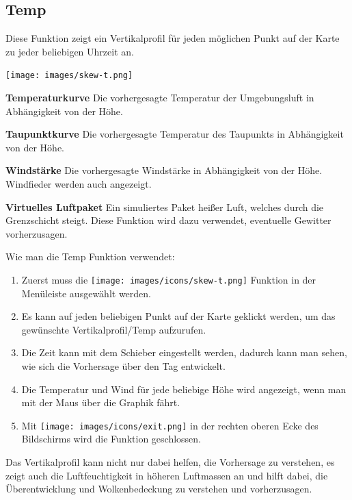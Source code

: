 \documentclass[11pt,a4paper]{article}
\begin{document}
\subsection{Temp}
Diese Funktion zeigt ein Vertikalprofil für jeden möglichen Punkt auf der Karte zu jeder beliebigen Uhrzeit an.
\begin{center}
\texttt{[image: images/skew-t.png]}
\end{center}
\begin{arrow_red}
\item \textbf{Temperaturkurve} Die vorhergesagte Temperatur der Umgebungsluft in Abhängigkeit von der Höhe.
\end{arrow_red}
\begin{arrow_green}
\item \textbf{Taupunktkurve} Die vorhergesagte Temperatur des Taupunkts in Abhängigkeit von der Höhe.
\end{arrow_green}
\begin{arrow_blue}
\item \textbf{Windstärke} Die vorhergesagte Windstärke in Abhängigkeit von der Höhe. Windfieder werden auch angezeigt.
\end{arrow_blue}
\begin{arrow_pink}
\item \textbf{Virtuelles Luftpaket} Ein simuliertes Paket heißer Luft, welches durch die Grenzschicht steigt. Diese Funktion wird dazu verwendet, eventuelle Gewitter vorherzusagen.
\end{arrow_pink}
Wie man die Temp Funktion verwendet:
\begin{enumerate}
\item Zuerst muss die  \texttt{[image: images/icons/skew-t.png]} Funktion in der Menüleiste ausgewählt werden.
\item Es kann auf jeden beliebigen Punkt auf der Karte geklickt werden, um das gewünschte Vertikalprofil/Temp aufzurufen.
\item Die Zeit kann mit dem Schieber eingestellt werden, dadurch kann man sehen, wie sich die Vorhersage über den Tag entwickelt. 
\item Die Temperatur und Wind für jede beliebige Höhe wird angezeigt, wenn man mit der Maus über die Graphik fährt.
\item Mit \texttt{[image: images/icons/exit.png]} in der rechten oberen Ecke des Bildschirms wird die Funktion geschlossen.
\end{enumerate}
\begin{tip}
\item Das Vertikalprofil kann nicht nur dabei helfen, die Vorhersage zu verstehen, es zeigt auch die Luftfeuchtigkeit in höheren Luftmassen an und hilft dabei, die Überentwicklung und Wolkenbedeckung zu verstehen und vorherzusagen.
\end{tip}
\end{document}
